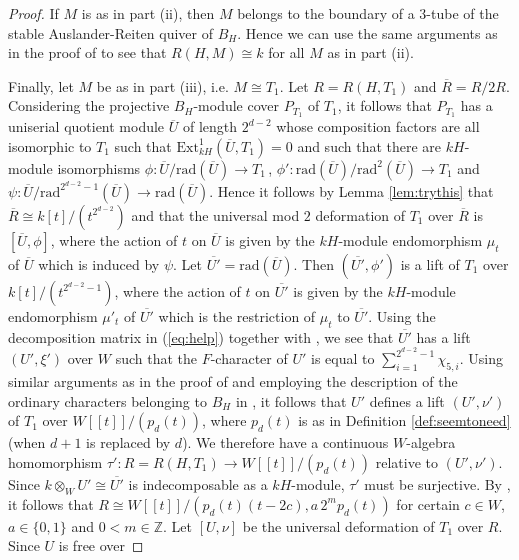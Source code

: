 \documentclass{amsart}
\theoremstyle{plain}
\theoremstyle{definition}
\theoremstyle{remark}
\begin{document}
\begin{proof}
If $M$ is as in part (ii), then $M$ belongs to the boundary of a $3$-tube of the stable Auslander-Reiten
quiver of $B_H$. Hence we can use the same arguments as in the proof of \cite[Cor. 5.2.5]{3sim} to
see that $R(H,M)\cong k$ for all $M$ as in part (ii).

Finally, let $M$ be as in part (iii), i.e. $M\cong T_1$. Let $R=R(H,T_1)$ and $\overline{R}=R/2R$.
Considering the projective $B_H$-module cover $P_{T_1}$ of $T_1$, it follows that $P_{T_1}$ 
has a uniserial quotient module $\overline{U}$ of length $2^{d-2}$ whose composition factors are 
all isomorphic to $T_1$ such that $\mathrm{Ext}^1_{kH}(\overline{U},T_1)=0$ and such that
there are $kH$-module isomorphisms 
$\phi:\overline{U}/\mathrm{rad} (\overline{U})\to T_1\,$, 
$\phi':\mathrm{rad}(\overline{U})/\mathrm{rad}^2 (\overline{U})\to T_1$ and
$\psi:\overline{U}/\mathrm{rad}^{2^{d-2}-1}(\overline{U}) \to \mathrm{rad}(\overline{U})$.
Hence it follows by Lemma \ref{lem:trythis} that 
$\overline{R}\cong k[t]/(t^{2^{d-2}})$
and that the universal mod $2$ deformation of $T_1$ over $\overline{R}$ is  
$[\overline{U},\phi]$, where the action of $t$ on $\overline{U}$ is 
given by the $kH$-module endomorphism $\mu_t$ of $\overline{U}$
which is induced by $\psi$. 
Let $\overline{U'}=\mathrm{rad}(\overline{U})$. Then $(\overline{U'},\phi')$ is a lift of $T_1$ over
$k[t]/(t^{2^{d-2}-1})$, where the action of $t$ on $\overline{U'}$ is given by the $kH$-module
endomorphism $\mu'_t$ of $\overline{U'}$ which is the restriction of $\mu_t$ to
$\overline{U'}$.
Using the decomposition matrix in (\ref{eq:help}) together with 
\cite[Prop. (23.7)]{CR}, we see that $\overline{U'}$ has a lift $(U',\xi')$ over $W$ such that 
the $F$-character of $U'$ is equal to $\sum_{i=1}^{2^{d-2}-1}\chi_{5,i}$. Using similar 
arguments as in the proof of \cite[Thm. 5.1]{3sim} and employing
the description of the ordinary characters belonging to $B_H$ in \cite[\S3.4]{3sim}, it follows that
$U'$ defines a lift $(U',\nu')$ of $T_1$ over $W[[t]]/(p_d(t))$, where $p_d(t)$ is as in Definition 
\ref{def:seemtoneed} (when $d+1$ is replaced by $d$). We therefore have a continuous $W$-algebra homomorphism 
$\tau':R=R(H,T_1)\to W[[t]]/(p_d(t))$ relative to $(U',\nu')$. Since $k\otimes_WU'\cong \overline{U'}$ is 
indecomposable as a $kH$-module, 
$\tau'$ must be surjective.  By \cite[Lemma 2.3.3]{3sim},  it follows that 
$R\cong W[[t]]/(p_d(t)(t-2c),a\,2^mp_d(t))$ for certain $c\in W$, $a\in\{0,1\}$ 
and $0 < m\in\mathbb{Z}$. 
Let $[U,\nu]$ be the universal deformation of $T_1$ over $R$. Since $U$ is free over

\end{proof}
\end{document}
